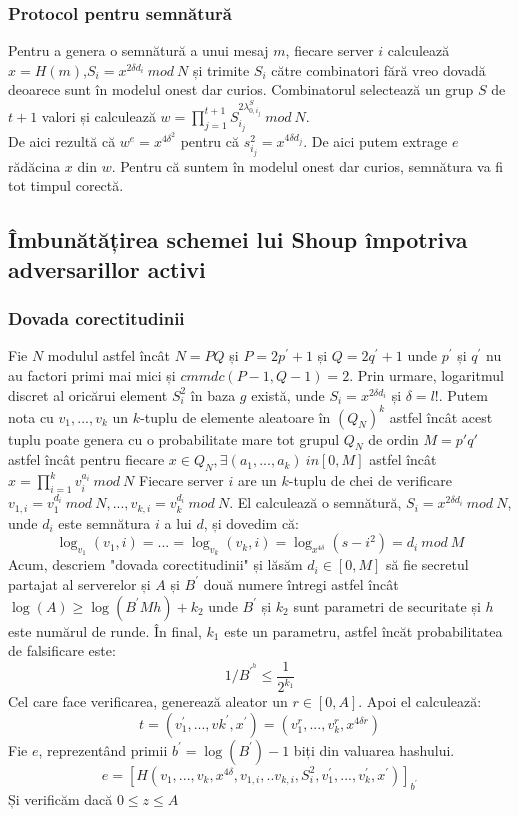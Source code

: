 \documentclass[12]{report}
\begin{document}
\subsubsection{Protocol pentru semnătură}
Pentru a genera o semnătură a unui mesaj $m$, fiecare server $i$ calculează $x=H(m)$,$S_i = x^{2 \delta d_i}  \ mod \ N$ și trimite $S_i$ către combinatori fără vreo dovadă deoarece sunt în modelul onest dar curios. Combinatorul selectează un grup $S$ de $t+1$ valori și calculează $ w = \prod_{j=1}^{t+1} S_{i_j}^{2 \lambda_{0,i_{j}}^{S} } \ mod \ N$. \\
De aici rezultă că $w^{e} = x^{4 \delta^2}$ pentru că $s_{i_j}^{2} = x^{4 \delta d_j}$. De aici putem extrage $e$ rădăcina $x$ din $w$. Pentru că suntem în modelul onest dar curios, semnătura va fi tot timpul corectă.

\subsection{Îmbunătățirea schemei lui Shoup împotriva adversarillor activi}
\subsubsection{Dovada corectitudinii}
Fie $N$ modulul astfel încât $N=PQ$ și $P = 2p^{'} +1 $ și $Q= 2q^{'} +1 $ unde $p^{'}$ și $q^{'}$ nu au factori primi mai mici și $cmmdc(P-1,Q-1)=2$. Prin urmare, logaritmul discret al oricărui element $S_i^{2}$ în baza $g$ există, unde $S_i = x^{2 \delta d_i}$ și $\delta = l!$. Putem nota cu $v_1,...,v_k$ un $k$-tuplu de elemente aleatoare în $(Q_N)^k$ astfel încât acest tuplu poate genera cu o probabilitate mare tot grupul $Q_N$ de ordin $M=p'q'$ astfel încât pentru fiecare $x \in Q_N, \exists (a_1,...,a_k) \ in [0,M] $ astfel încât $x = \prod_{i=1}^{k} v_i^{a_i} \ mod \ N$
Fiecare server $i$ are un $k$-tuplu de chei de verificare $v_{1,i} = v_1^{d_i} \ mod \ N,...,v_{k,i} = v_k^{d_i} \ mod \ N$. El calculează o semnătură, $S_i = x^{2 \delta d_i} \ mod \ N$, unde $d_i$ este semnătura $i$ a lui $d$, și dovedim că:
$$ \log_{v_1} (v_1,i) = ... = \log_{v_k} (v_k,i) = \log_{x^{4 \delta}} (s-{i}^{2}) = d_i \ mod \ M $$
Acum, descriem "dovada corectitudinii" și lăsăm $d_i \in [0,M]$ să fie secretul partajat al serverelor și $A$ și $B^{'}$ două numere întregi astfel încât $\log(A) \geqslant \log(B^{'} Mh) +k_2$ unde $B^{'}$ și $k_2$ sunt parametri de securitate și $h$ este numărul de runde. În final, $k_1$ este un parametru, astfel încăt probabilitatea de falsificare este:
$$1/B^{\prime ^{h}} \leqslant \frac{1}{2^{k_1}}$$
Cel care face verificarea, generează aleator un $r \in [0,A]$. Apoi el calculează:
$$t= (v_{1}^{'},...,v{k}^{'},x^{'})=(v_{1}^{r},...,v_{k}^{r},x^{4 \delta r})$$
Fie $e$, reprezentând primii $b^{'} =\log(B^{'})-1$ biți din valuarea hashului.
$$ e= [H(v_1,...,v_k,x^{4 \delta},v_{1,i},..v_{k,i},S_{i}^{2},v_{1}^{'},...,v_{k}^{'},x^{'})]_{b^{'}} $$
Și verificăm dacă $0 \leqslant z \leqslant A $
\end{document}
